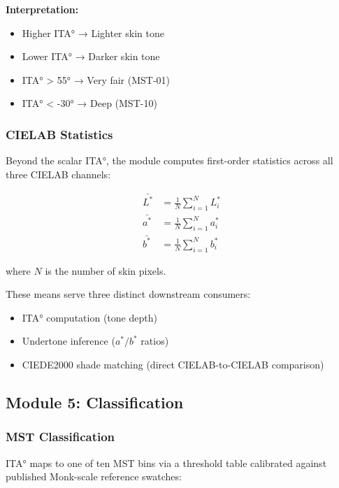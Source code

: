 \textbf{Interpretation:}
\begin{itemize}
    \item Higher ITA° → Lighter skin tone
    \item Lower ITA° → Darker skin tone
    \item ITA° > 55° → Very fair (MST-01)
    \item ITA° < -30° → Deep (MST-10)
\end{itemize}

\subsubsection{CIELAB Statistics}

Beyond the scalar ITA°, the module computes first-order statistics across all three CIELAB channels:

\begin{align}
    \bar{L^*} &= \frac{1}{N} \sum_{i=1}^{N} L_i^* \\
    \bar{a^*} &= \frac{1}{N} \sum_{i=1}^{N} a_i^* \\
    \bar{b^*} &= \frac{1}{N} \sum_{i=1}^{N} b_i^*
\end{align}

where $N$ is the number of skin pixels.

These means serve three distinct downstream consumers:
\begin{itemize}
    \item ITA° computation (tone depth)
    \item Undertone inference ($a^*/b^*$ ratios)
    \item CIEDE2000 shade matching (direct CIELAB-to-CIELAB comparison)
\end{itemize}

\subsection{Module 5: Classification}

\subsubsection{MST Classification}

ITA° maps to one of ten MST bins via a threshold table calibrated against published Monk-scale reference swatches:

